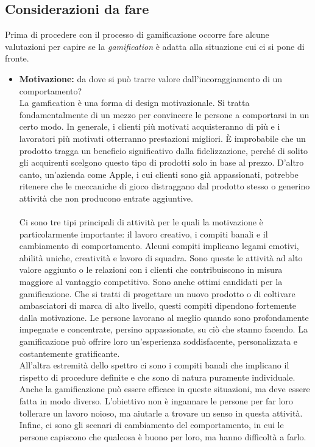 \subsection{Considerazioni da fare}
Prima di procedere con il processo di gamificazione occorre fare alcune valutazioni per capire se la \textit{gamification} è adatta alla situazione cui ci si pone di fronte.
\begin{itemize}
  \item \textbf{Motivazione:} da dove si può trarre valore dall'incoraggiamento di un comportamento?\\
  La gamfication è una forma di design motivazionale. Si tratta fondamentalmente di un mezzo per convincere le persone a comportarsi in un certo modo. In generale, i clienti più motivati acquisteranno di più e i lavoratori più motivati otterranno prestazioni migliori.
È improbabile che un prodotto tragga un beneficio significativo dalla fidelizzazione, perché di solito gli acquirenti scelgono questo tipo di prodotti solo in base al prezzo. D'altro canto, un'azienda come Apple, i cui clienti sono già appassionati, potrebbe ritenere che le meccaniche di gioco distraggano dal prodotto stesso o generino attività che non producono entrate aggiuntive.\\
\\
Ci sono tre tipi principali di attività per le quali la motivazione è particolarmente importante: il lavoro creativo, i compiti banali e il cambiamento di comportamento. Alcuni compiti implicano legami emotivi, abilità uniche, creatività e lavoro di squadra.
Sono queste le attività ad alto valore aggiunto o le relazioni con i clienti che contribuiscono in misura maggiore al vantaggio competitivo. Sono anche ottimi candidati per la gamificazione. Che si tratti di progettare un nuovo prodotto o di coltivare ambasciatori di marca di alto livello, questi compiti dipendono fortemente dalla motivazione.
Le persone lavorano al meglio quando sono profondamente impegnate e concentrate, persino appassionate, su ciò che stanno facendo. La gamificazione può offrire loro un'esperienza soddisfacente, personalizzata e costantemente gratificante.\\
All'altra estremità dello spettro ci sono i compiti banali che implicano il rispetto di procedure definite e che sono di natura puramente individuale. Anche la gamificazione può essere efficace in queste situazioni, ma deve essere fatta in modo diverso. L'obiettivo non è ingannare le persone per far loro tollerare un lavoro noioso, ma aiutarle a trovare un senso in questa attività. Infine, ci sono gli scenari di cambiamento del comportamento, in cui le persone capiscono che qualcosa è buono per loro, ma hanno difficoltà a farlo.

\end{itemize}
